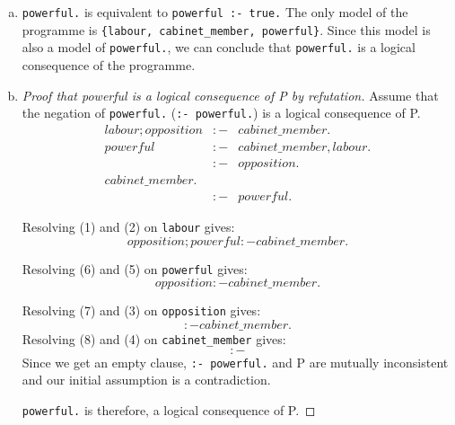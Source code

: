 \documentclass[a4paper,11pt]{article}
\begin{document}
\begin{enumerate}[(a)]
\item \verb#powerful.# is equivalent to \verb#powerful :- true.# The only model
  of the programme is \verb#{labour, cabinet_member, powerful}#. Since this
  model is also a model of \verb#powerful.#, we can conclude that
  \verb#powerful.# is a logical consequence of the programme.

\item
\begin{proof}[Proof that powerful is a logical consequence of P by refutation]

Assume that the negation of \verb#powerful.# (\verb#:- powerful.#) is a logical
consequence of P.\\
\begin{eqnarray}
  labour; opposition &:-& cabinet\_member.\\
  powerful &:-& cabinet\_member, labour.\\
  &:-& opposition.\\
  cabinet\_member.\\
  &:-& powerful.
\end{eqnarray}

Resolving (1) and (2) on \verb,labour, gives:
\begin{equation}
opposition; powerful :- cabinet\_member.
\end{equation}

Resolving (6) and (5) on \verb,powerful, gives:
\begin{equation}
opposition :- cabinet\_member.
\end{equation}

Resolving (7) and (3) on \verb,opposition, gives:
\begin{equation}
:- cabinet\_member.
\end{equation}
Resolving (8) and (4) on \verb,cabinet_member, gives:
\begin{equation}
:-
\end{equation}
Since we get an empty clause, \verb#:- powerful.# and P are mutually
inconsistent and our initial assumption is a contradiction.

\verb#powerful.# is therefore, a logical consequence of P.
\end{proof}

\end{enumerate}
\end{document}
